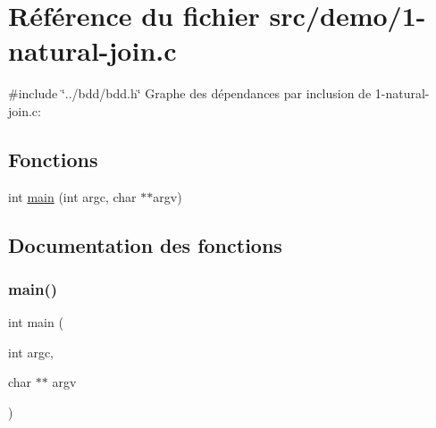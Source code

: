 \hypertarget{1-natural-join_8c}{}\section{Référence du fichier src/demo/1-\/natural-\/join.c}
\label{1-natural-join_8c}
{\ttfamily \#include \char`\"{}../bdd/bdd.\+h\char`\"{}}\newline
Graphe des dépendances par inclusion de 1-\/natural-\/join.c\+:
\subsection*{Fonctions}
\begin{DoxyCompactItemize}
\item 
int \hyperlink{1-natural-join_8c_a3c04138a5bfe5d72780bb7e82a18e627}{main} (int argc, char $\ast$$\ast$argv)
\end{DoxyCompactItemize}


\subsection{Documentation des fonctions}
\mbox{\label{1-natural-join_8c_a3c04138a5bfe5d72780bb7e82a18e627}} 
\subsubsection{\texorpdfstring{main()}{main()}}
{\footnotesize\ttfamily int main (\begin{DoxyParamCaption}\item[{int}]{argc,  }\item[{char $\ast$$\ast$}]{argv }\end{DoxyParamCaption})}

